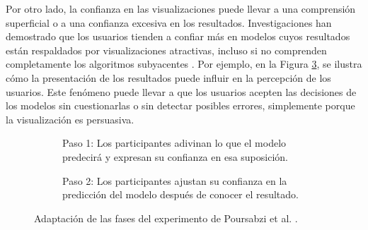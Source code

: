 Por otro lado, la confianza en las visualizaciones puede llevar a una comprensión superficial o a una confianza excesiva en los resultados. Investigaciones han demostrado que los usuarios tienden a confiar más en modelos cuyos resultados están respaldados por visualizaciones atractivas, incluso si no comprenden completamente los algoritmos subyacentes \cite{Kaur-2020}. Por ejemplo, en la Figura \ref{fig:confianza_experimento}, se ilustra cómo la presentación de los resultados puede influir en la percepción de los usuarios. Este fenómeno puede llevar a que los usuarios acepten las decisiones de los modelos sin cuestionarlas o sin detectar posibles errores, simplemente porque la visualización es persuasiva. 

\begin{figure}[htbp]
    \centering
    \begin{subfigure}[b]{0.485\textwidth}
        \centering
        \caption{Paso 1: Los participantes adivinan lo que el modelo predecirá y expresan su confianza en esa suposición.}
        \label{fig:question1}
    \end{subfigure}
    \hfill
    \begin{subfigure}[b]{0.485\textwidth}
        \centering
        \caption{Paso 2: Los participantes ajustan su confianza en la predicción del modelo después de conocer el resultado.}
        \label{fig:question2}
    \end{subfigure}
    \caption{Adaptación de las fases del experimento de Poursabzi et al. \cite{Poursabzi-2021}.}
    \label{fig:confianza_experimento}
\end{figure}

